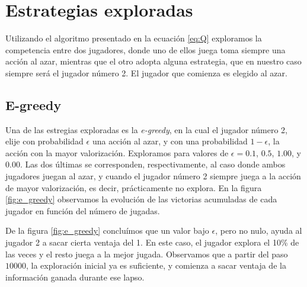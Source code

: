 \documentclass[11pt, spanish]{article}
\begin{document}
\section{Estrategias exploradas}
\par Utilizando el algoritmo presentado en la ecuación \ref{eq:Q} exploramos la competencia entre dos jugadores, donde uno de ellos juega toma siempre una acción al azar, mientras que el otro adopta alguna estrategia, que en nuestro caso siempre será el jugador número 2. El jugador que comienza es elegido al azar.

\subsection{E-greedy}
\par Una de las estregias exploradas es la \emph{e-greedy}, en la cual el jugador número 2, elije con probabilidad $\epsilon$ una acción al azar, y con una probabilidad $1-\epsilon$, la acción con la mayor valorización. Exploramos para valores de $\epsilon = 0.1$, $0.5$, $1.00$, y $0.00$. Las dos últimas se corresponden, respectivamente, al caso donde ambos jugadores juegan al azar, y cuando el jugador número 2 siempre juega a la acción de mayor valorización, es decir, prácticamente no explora. En la figura \ref{fig:e_greedy} observamos la evolución de las victorias acumuladas de cada jugador en función del número de jugadas.
\par De la figura \ref{fig:e_greedy} concluímos que un valor bajo $\epsilon$, pero no nulo, ayuda al jugador 2 a sacar cierta ventaja del 1. En este caso, el jugador explora el 10\% de las veces y el resto juega a la mejor jugada. Observamos que a partir del paso $10000$, la exploración inicial ya es suficiente, y comienza a sacar ventaja de la información ganada durante ese lapso. 
\end{document}
